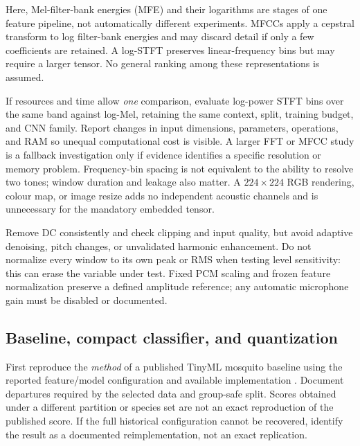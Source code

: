 \documentclass[a4paper,11pt]{article}
\begin{document}
Here, Mel-filter-bank energies (MFE) and their logarithms are stages of one feature pipeline, not automatically different experiments. MFCCs apply a cepstral transform to log filter-bank energies and may discard detail if only a few coefficients are retained. A log-STFT preserves linear-frequency bins but may require a larger tensor. No general ranking among these representations is assumed.

If resources and time allow \emph{one} comparison, evaluate log-power STFT bins over the same band against log-Mel, retaining the same context, split, training budget, and CNN family. Report changes in input dimensions, parameters, operations, and RAM so unequal computational cost is visible. A larger FFT or MFCC study is a fallback investigation only if evidence identifies a specific resolution or memory problem. Frequency-bin spacing is not equivalent to the ability to resolve two tones; window duration and leakage also matter. A $224\times224$ RGB rendering, colour map, or image resize adds no independent acoustic channels and is unnecessary for the mandatory embedded tensor.

Remove DC consistently and check clipping and input quality, but avoid adaptive denoising, pitch changes, or unvalidated harmonic enhancement. Do not normalize every window to its own peak or RMS when testing level sensitivity: this can erase the variable under test. Fixed PCM scaling and frozen feature normalization preserve a defined amplitude reference; any automatic microphone gain must be disabled or documented.

\subsection{Baseline, compact classifier, and quantization}
First reproduce the \emph{method} of a published TinyML mosquito baseline using the reported feature/model configuration and available implementation \cite{tinyml}. Document departures required by the selected data and group-safe split. Scores obtained under a different partition or species set are not an exact reproduction of the published score. If the full historical configuration cannot be recovered, identify the result as a documented reimplementation, not an exact replication.
\end{document}
